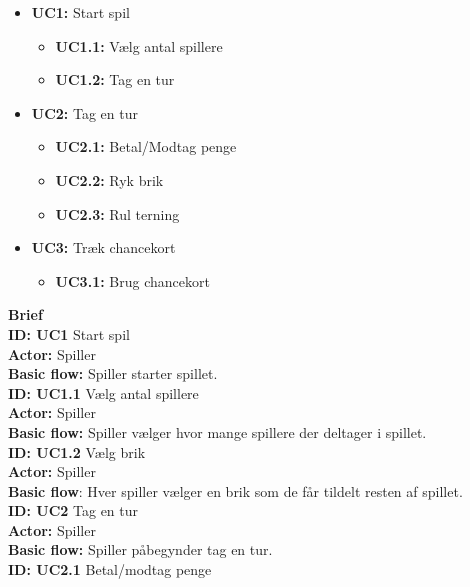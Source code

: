 \begin{itemize}
    \item \textbf{UC1:} Start spil
    \begin{itemize}
        \item \textbf{UC1.1:} Vælg antal spillere
        \item \textbf{UC1.2:} Tag en tur
    \end{itemize}
    \item \textbf{UC2:} Tag en tur
    \begin{itemize}
        \item \textbf{UC2.1:} Betal/Modtag penge
        \item \textbf{UC2.2:} Ryk brik
        \item \textbf{UC2.3:} Rul terning
    \end{itemize}
    \item \textbf{UC3:} Træk chancekort
    \begin{itemize}
        \item \textbf{UC3.1:} Brug chancekort
    \end{itemize}
\end{itemize}
\newline
\textbf{Brief}\\
\newline
\textbf{ID: UC1} Start spil \\
\textbf{Actor:} Spiller\\
\textbf{Basic flow:} Spiller starter spillet.\\
\newline
\textbf{ID: UC1.1} Vælg antal spillere\\
\textbf{Actor:} Spiller\\
\textbf{Basic flow:} Spiller vælger hvor mange spillere der deltager i spillet.\\
\newline
\textbf{ID: UC1.2} Vælg brik \\
\textbf{Actor:} Spiller \\
\textbf{Basic flow}: Hver spiller vælger en brik som de får tildelt resten af spillet. \\
\newline
\textbf{ID: UC2} Tag en tur \\
\textbf{Actor:} Spiller \\
\textbf{Basic flow: } Spiller påbegynder tag en tur. \\
\newline
\textbf{ID: UC2.1} Betal/modtag penge \\
